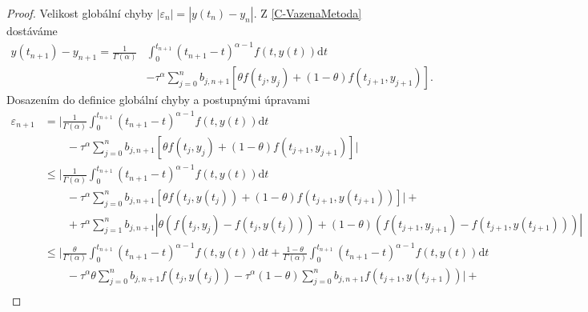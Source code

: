\documentclass[a4paper,12pt,twoside]{article}
\theoremstyle{definition}
\theoremstyle{remark}
\numberwithin{equation}{section}
\numberwithin{table}{section}
\numberwithin{figure}{section}
\newcommand{\dx}[1]{\mathrm{d} #1}
\begin{document}
\begin{proof}%
	Velikost globální chyby $|\varepsilon_{n}| = |y\left(t_{n}\right) - y_{n}|$.
	Z \eqref{C-VazenaMetoda} dostáváme
	\begin{equation}
		\begin{aligned}	
		y\left(t_{n+1}\right) - y_{n+1} = \frac{1}{\Gamma\left(\alpha\right)} &\int_{0}^{t_{n+1}} \left(t_{n+1} - t\right)^{\alpha - 1} f \left(t, y\left(t\right)\right) \dx{t} \\ &- \tau^{\alpha} \sum_{j = 0}^{n} 	b_{j,n+1} \left[\theta f\left(t_{j}, y_{j}\right) + \left(1-\theta \right)f \left(t_{j+1}, y_{j+1}\right)\right].
		\end{aligned}	
	\end{equation}
	Dosazením do definice globální chyby a postupnými úpravami
	\begin{equation}
		\begin{aligned}	
			\varepsilon_{n+1} &= \bigg|\frac{1}{\Gamma\left(\alpha\right)} \int_{0}^{t_{n+1}} \left(t_{n+1} - t\right)^{\alpha - 1} f \left(t, y\left(t\right)\right) \dx{t}  \\
			& \qquad - \tau^{\alpha} \sum_{j = 0}^{n} 	b_{j,n+1} \left[\theta f\left(t_{j}, y_{j}\right) + \left(1-\theta \right)f \left(t_{j+1}, y_{j+1}\right)\right]\bigg|  \\
			&\leq \bigg| \frac{1}{\Gamma\left(\alpha\right)} \int_{0}^{t_{n+1}} \left(t_{n+1} - t\right)^{\alpha - 1} f \left(t, y\left(t\right)\right) \dx{t}  \\ 
			& \qquad - \tau^{\alpha} \sum_{j = 0}^{n} 	b_{j,n+1} \left[\theta f\left(t_{j}, y\left(t_{j}\right)\right) + \left(1-\theta \right)f \left(t_{j+1}, y\left(t_{j+1}\right) \right)\right] \bigg|   + \\
			& \qquad + \tau^{\alpha} \sum_{j = 1}^{n} 	b_{j,n+1} |\theta \left(f\left(t_{j}, y_{j}\right) - f\left(t_{j}, y\left(t_{j}\right)\right) \right) + \left(1-\theta \right) \left(f \left(t_{j+1}, y_{j+1}\right) - f \left(t_{j+1}, y\left(t_{j+1}\right) \right) \right)| \\
			&\leq \bigg| \frac{\theta}{\Gamma\left(\alpha\right)} \int_{0}^{t_{n+1}} \left(t_{n+1} - t\right)^{\alpha - 1} f \left(t, y\left(t\right)\right) \dx{t} + \frac{1-\theta}{\Gamma\left(\alpha\right)} \int_{0}^{t_{n+1}} \left(t_{n+1} - t\right)^{\alpha - 1} f \left(t, y\left(t\right)\right) \dx{t} \\ 
			& \qquad - \tau^{\alpha} \theta \sum_{j = 0}^{n} 	b_{j,n+1}  f\left(t_{j}, y\left(t_{j}\right)\right) - \tau^{\alpha} \left(1-\theta \right) \sum_{j = 0}^{n} 	b_{j,n+1} f \left(t_{j+1}, y\left(t_{j+1}\right) \right)                \bigg|   + \\

\end{aligned}
\end{equation}
\end{proof}
\end{document}
